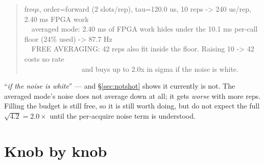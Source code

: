 \begin{quote}\small{} freqs, order=forward (2 slots/rep), tau=120.0 us, 10 reps -> 240 us/rep, 2.40 ms FPGA work\\
\ \ averaged mode: 2.40 ms of FPGA work hides under the 10.1 ms per-call floor (24\% used) -> 87.7 Hz\\
\ \ FREE AVERAGING: 42 reps also fit inside the floor. Raising 10 -> 42 costs no rate\\
\ \ \ \ \ \ \ \ \ \ \ \ \ \ \ \ and buys up to 2.0x in sigma if the noise is white.
\end{quote}

\begin{openbox}
``\emph{if the noise is white}'' --- and \S\ref{sec:notshot} shows it currently is
not. The averaged mode's noise does not average down at all; it gets \emph{worse}
with more reps. Filling the budget is still free, so it is still worth doing, but
do not expect the full $\sqrt{4.2}=2.0\times$ until the per-acquire noise term is
understood.
\end{openbox}

\section{Knob by knob}
\label{sec:knobs}

